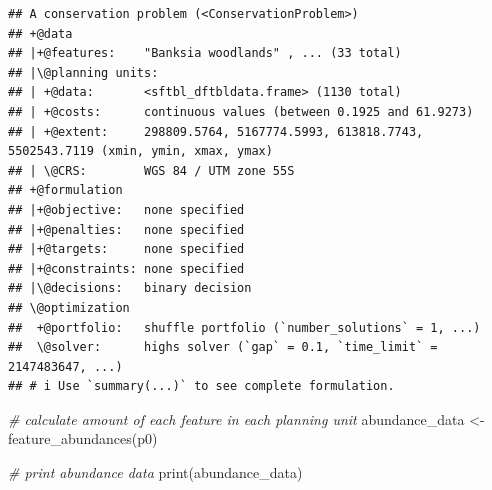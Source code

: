 \documentclass[
  12pt,
]{book}
\newenvironment{Shaded}{\begin{snugshade}}{\end{snugshade}}
\newcommand{\CommentTok}[1]{\textcolor[rgb]{0.56,0.35,0.01}{\textit{#1}}}
\newcommand{\FunctionTok}[1]{\textcolor[rgb]{0.00,0.00,0.00}{#1}}
\newcommand{\NormalTok}[1]{#1}
\newcommand{\OtherTok}[1]{\textcolor[rgb]{0.56,0.35,0.01}{#1}}
\begin{document}
\begin{verbatim}
## A conservation problem (<ConservationProblem>)
## +@data
## |+@features:    "Banksia woodlands" , ... (33 total)
## |\@planning units:
## | +@data:       <sftbl_dftbldata.frame> (1130 total)
## | +@costs:      continuous values (between 0.1925 and 61.9273)
## | +@extent:     298809.5764, 5167774.5993, 613818.7743, 5502543.7119 (xmin, ymin, xmax, ymax)
## | \@CRS:        WGS 84 / UTM zone 55S
## +@formulation
## |+@objective:   none specified
## |+@penalties:   none specified
## |+@targets:     none specified
## |+@constraints: none specified
## |\@decisions:   binary decision
## \@optimization
##  +@portfolio:   shuffle portfolio (`number_solutions` = 1, ...)
##  \@solver:      highs solver (`gap` = 0.1, `time_limit` = 2147483647, ...)
## # i Use `summary(...)` to see complete formulation.
\end{verbatim}

\begin{Shaded}
\begin{Highlighting}[]
\CommentTok{\# calculate amount of each feature in each planning unit}
\NormalTok{abundance\_data }\OtherTok{\textless{}{-}} \FunctionTok{feature\_abundances}\NormalTok{(p0)}

\CommentTok{\# print abundance data}
\FunctionTok{print}\NormalTok{(abundance\_data)}
\end{Highlighting}
\end{Shaded}
\end{document}
